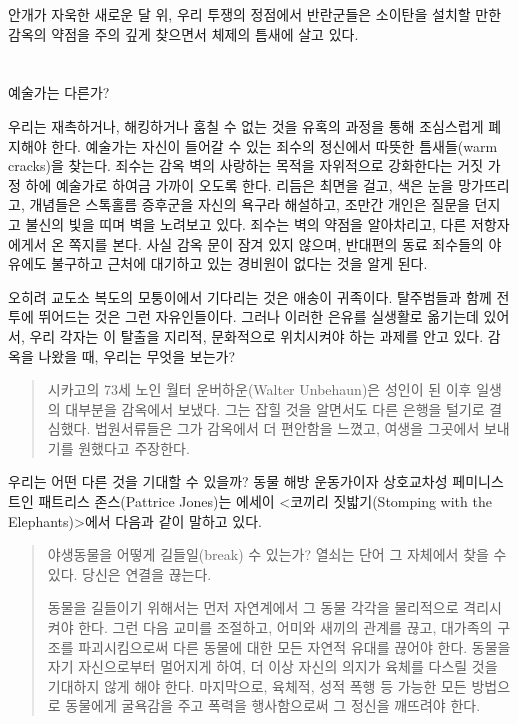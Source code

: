 \documentclass[10pt, b6paper, openany]{memoir}
\begin{document}
\begin{article}
안개가 자욱한 새로운 달 위, 우리 투쟁의 정점에서 반란군들은 소이탄을 설치할 만한 감옥의 약점을 주의 깊게 찾으면서 체제의 틈새에 살고 있다.

\section{}

예술가는 다른가?

우리는 재촉하거나, 해킹하거나 훔칠 수 없는 것을 유혹의 과정을 통해 조심스럽게 폐지해야 한다. 예술가는 자신이 들어갈 수 있는 죄수의 정신에서 따뜻한 틈새들(warm cracks)을 찾는다. 죄수는 감옥 벽의 사랑하는 목적을 자위적으로 강화한다는 거짓 가정 하에 예술가로 하여금 가까이 오도록 한다. 리듬은 최면을 걸고, 색은 눈을 망가뜨리고, 개념들은 스톡홀름 증후군을 자신의 욕구라 해설하고, 조만간 개인은 질문을 던지고 불신의 빛을 띠며 벽을 노려보고 있다. 죄수는 벽의 약점을 알아차리고, 다른 저항자에게서 온 쪽지를 본다. 사실 감옥 문이 잠겨 있지 않으며, 반대편의 동료 죄수들의 야유에도 불구하고 근처에 대기하고 있는 경비원이 없다는 것을 알게 된다. 

오히려 교도소 복도의 모퉁이에서 기다리는 것은 애송이 귀족이다. 탈주범들과 함께 전투에 뛰어드는 것은 그런 자유인들이다. 그러나 이러한 은유를 실생활로 옮기는데 있어서, 우리 각자는 이 탈출을 지리적, 문화적으로 위치시켜야 하는 과제를 안고 있다. 감옥을 나왔을 때, 우리는 무엇을 보는가?

\begin{quote}
시카고의 73세 노인 월터 운버하운(Walter Unbehaun)은 성인이 된 이후 일생의 대부분을 감옥에서 보냈다. 그는 잡힐 것을 알면서도 다른 은행을 털기로 결심했다. 법원서류들은 그가 감옥에서 더 편안함을 느꼈고, 여생을 그곳에서 보내기를 원했다고 주장한다.\parencite{atcl:ap2013}
\end{quote}

우리는 어떤 다른 것을 기대할 수 있을까? 동물 해방 운동가이자 상호교차성 페미니스트인 패트리스 존스(Pattrice Jones)는 에세이 <코끼리 짓밟기(Stomping with the Elephants)>\parencite{ibk:pattrice2006}에서 다음과 같이 말하고 있다. 

\begin{quote}
야생동물을 어떻게 길들일(break) 수 있는가? 열쇠는 단어 그 자체에서 찾을 수 있다. 당신은 연결을 끊는다. 

동물을 길들이기 위해서는 먼저 자연계에서 그 동물 각각을 물리적으로 격리시켜야 한다. 그런 다음 교미를 조절하고, 어미와 새끼의 관계를 끊고, 대가족의 구조를 파괴시킴으로써 다른 동물에 대한 모든 자연적 유대를 끊어야 한다. 동물을 자기 자신으로부터 멀어지게 하여, 더 이상 자신의 의지가 육체를 다스릴 것을 기대하지 않게 해야 한다. 마지막으로, 육체적, 성적 폭행 등 가능한 모든 방법으로 동물에게 굴욕감을 주고 폭력을 행사함으로써 그 정신을 깨뜨려야 한다. 


\end{quote}
\end{article}
\end{document}
